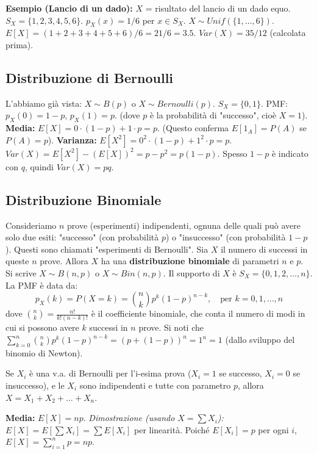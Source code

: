 \begin{example}
\textbf{Esempio (Lancio di un dado):}
$X$ = risultato del lancio di un dado equo.
$S_X = \{1, 2, 3, 4, 5, 6\}$. $p_X(x) = 1/6$ per $x \in S_X$. $X \sim Unif(\{1, \dots, 6\})$.
$E[X] = (1+2+3+4+5+6)/6 = 21/6 = 3.5$.
$Var(X) = 35/12$ (calcolata prima).
\end{example}

\subsection{Distribuzione di Bernoulli}
L'abbiamo già vista: $X \sim B(p)$ o $X \sim Bernoulli(p)$.
$S_X = \{0, 1\}$.
PMF: $p_X(0) = 1-p$, $p_X(1) = p$.
(dove $p$ è la probabilità di "successo", cioè $X=1$).
\textbf{Media:} $E[X] = 0 \cdot (1-p) + 1 \cdot p = p$.
(Questo conferma $E[1_A]=P(A)$ se $P(A)=p$).
\textbf{Varianza:}
$E[X^2] = 0^2 \cdot (1-p) + 1^2 \cdot p = p$.
$Var(X) = E[X^2] - (E[X])^2 = p - p^2 = p(1-p)$.
Spesso $1-p$ è indicato con $q$, quindi $Var(X)=pq$.

\subsection{Distribuzione Binomiale}
Consideriamo $n$ prove (esperimenti) indipendenti, ognuna delle quali può avere solo due esiti: "successo" (con probabilità $p$) o "insuccesso" (con probabilità $1-p$). Questi sono chiamati "esperimenti di Bernoulli".
Sia $X$ il numero di successi in queste $n$ prove. Allora $X$ ha una \textbf{distribuzione binomiale} di parametri $n$ e $p$. Si scrive $X \sim B(n,p)$ o $X \sim Bin(n,p)$.
Il supporto di $X$ è $S_X = \{0, 1, 2, \dots, n\}$.
La PMF è data da:
\[ p_X(k) = P(X=k) = \binom{n}{k} p^k (1-p)^{n-k}, \quad \text{per } k=0, 1, \dots, n \]
dove $\binom{n}{k} = \frac{n!}{k!(n-k)!}$ è il coefficiente binomiale, che conta il numero di modi in cui si possono avere $k$ successi in $n$ prove.
Si noti che $\sum_{k=0}^n \binom{n}{k} p^k (1-p)^{n-k} = (p + (1-p))^n = 1^n = 1$ (dallo sviluppo del binomio di Newton).

Se $X_i$ è una v.a. di Bernoulli per l'i-esima prova ($X_i=1$ se successo, $X_i=0$ se insuccesso), e le $X_i$ sono indipendenti e tutte con parametro $p$, allora $X = X_1 + X_2 + \dots + X_n$.

\textbf{Media:} $E[X] = np$.
\textit{Dimostrazione (usando $X=\sum X_i$):} $E[X] = E[\sum X_i] = \sum E[X_i]$ per linearità.
Poiché $E[X_i]=p$ per ogni $i$, $E[X] = \sum_{i=1}^n p = np$.

